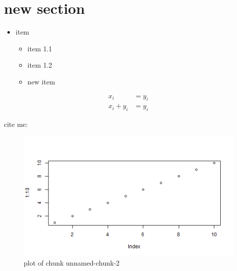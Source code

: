 \section{new section}\label{new-section}

\begin{itemize}
\itemsep1pt\parskip0pt
\item
  item

  \begin{itemize}
  \itemsep1pt\parskip0pt
  \item
    item 1.1
  \item
    item 1.2
  \item
    new item
  \end{itemize}
\end{itemize}

\[
\begin{aligned}
x_i &= y_i \\
x_i + y_i &= y_i
\end{aligned}
\]

cite me: \textcite{Abb97}

\begin{Shaded}
\begin{Highlighting}[]
\StringTok{ }
\end{Highlighting}
\end{Shaded}

\begin{Shaded}
\begin{Highlighting}[]
\NormalTok{(}\NormalTok{:}\NormalTok{)}
\end{Highlighting}
\end{Shaded}

\begin{figure}[htbp]
\centering
\includegraphics{figs/test/unnamed-chunk-2-1.png}
\caption{plot of chunk unnamed-chunk-2}
\end{figure}

